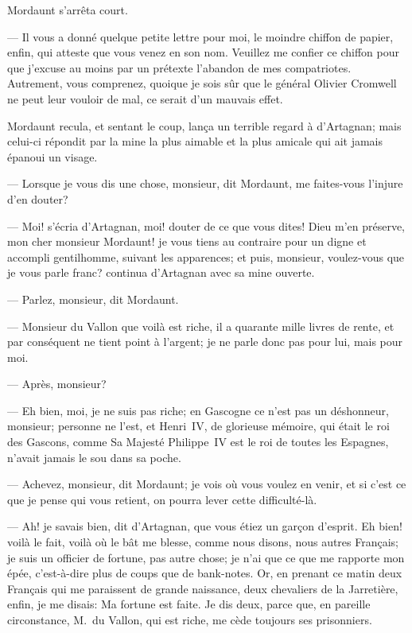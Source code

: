Mordaunt s'arrêta court.

— Il vous a donné quelque petite lettre pour moi, le moindre chiffon de papier, enfin, qui atteste que vous venez en son nom. Veuillez me confier ce chiffon pour que j'excuse au moins par un prétexte l'abandon de mes compatriotes. Autrement, vous comprenez, quoique je sois sûr que le général Olivier Cromwell ne peut leur vouloir de mal, ce serait d'un mauvais effet.

Mordaunt recula, et sentant le coup, lança un terrible regard à d'Artagnan; mais celui-ci répondit par la mine la plus aimable et la plus amicale qui ait jamais épanoui un visage.

— Lorsque je vous dis une chose, monsieur, dit Mordaunt, me faites-vous l'injure d'en douter?

— Moi! s'écria d'Artagnan, moi! douter de ce que vous dites! Dieu m'en préserve, mon cher monsieur Mordaunt! je vous tiens au contraire pour un digne et accompli gentilhomme, suivant les apparences; et puis, monsieur, voulez-vous que je vous parle franc? continua d'Artagnan avec sa mine ouverte.

— Parlez, monsieur, dit Mordaunt.

— Monsieur du Vallon que voilà est riche, il a quarante mille livres de rente, et par conséquent ne tient point à l'argent; je ne parle donc pas pour lui, mais pour moi.

— Après, monsieur?

— Eh bien, moi, je ne suis pas riche; en Gascogne ce n'est pas un déshonneur, monsieur; personne ne l'est, et Henri~IV, de glorieuse mémoire, qui était le roi des Gascons, comme Sa Majesté Philippe~IV est le roi de toutes les Espagnes, n'avait jamais le sou dans sa poche.

— Achevez, monsieur, dit Mordaunt; je vois où vous voulez en venir, et si c'est ce que je pense qui vous retient, on pourra lever cette difficulté-là.

— Ah! je savais bien, dit d'Artagnan, que vous étiez un garçon d'esprit. Eh bien! voilà le fait, voilà où le bât me blesse, comme nous disons, nous autres Français; je suis un officier de fortune, pas autre chose; je n'ai que ce que me rapporte mon épée, c'est-à-dire plus de coups que de bank-notes. Or, en prenant ce matin deux Français qui me paraissent de grande naissance, deux chevaliers de la Jarretière, enfin, je me disais: Ma fortune est faite. Je dis deux, parce que, en pareille circonstance, M.~du Vallon, qui est riche, me cède toujours ses prisonniers.

